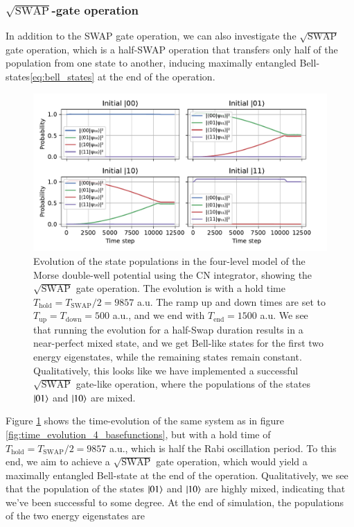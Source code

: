 \documentclass{subfiles}
\begin{document}
\subsubsection*{$\sqrt{\text{SWAP}}$-gate operation}
In addition to the SWAP gate operation, we can also investigate the $\sqrt{\text{SWAP}}$ gate operation, which is a half-SWAP operation that transfers only half of the population from one state to another, inducing maximally entangled Bell-states\eqref{eq:bell_states} at the end of the operation. 
\begin{figure}[h!]
    \centering
    \includegraphics[width=1.0\textwidth]{figs/time_evolution_4_basefunctions_2206_squareSWAP.pdf}
    \caption{Evolution of the state populations in the four-level model of the Morse double-well potential using the CN integrator, showing the $\sqrt{\text{SWAP}}$ gate operation. The evolution is with a hold time $T_{\text{hold}} = T_{\text{SWAP}}/2 = 9857$ a.u. The ramp up and down times are set to $T_{\text{up}} = T_{\text{down}} = 500$ a.u., and we end with $T_{\text{end}} = 1500$ a.u. We see that running the evolution for a half-Swap duration results in a near-perfect mixed state, and we get Bell-like states for the first two energy eigenstates, while the remaining states remain constant. Qualitatively, this looks like we have implemented a successful $\sqrt{\text{SWAP}}$ gate-like operation, where the populations of the states $\ket{01}$ and $\ket{10}$ are mixed.}
    \label{fig:time_evolution_4_basefunctions_sqrtSWAP}
\end{figure}
Figure \ref{fig:time_evolution_4_basefunctions_sqrtSWAP} shows the time-evolution of the same system as in figure \ref{fig:time_evolution_4_basefunctions}, but with a hold time of $T_{\text{hold}} = T_{\text{SWAP}}/2 = 9857$ a.u., which is half the Rabi oscillation period. To this end, we aim to achieve a $\sqrt{\text{SWAP}}$ gate operation, which would yield a maximally entangled Bell-state at the end of the operation. Qualitatively, we see that the population of the states $\ket{01}$ and $\ket{10}$ are highly mixed, indicating that we've been successful to some degree. At the end of simulation, the populations of the two energy eigenstates are
\end{document}
